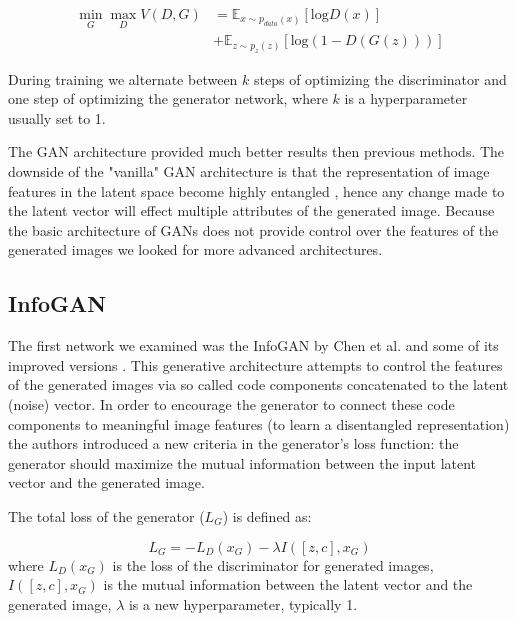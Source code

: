 \documentclass{egpubl}
\begin{document}
\begin{equation}
\begin{aligned}
\min_G \max_D V(D,G) &= \mathbb{E}_{x\sim p_{data}(x)}\left[ \mathrm{log}D(x) \right] \\
&+ \mathbb{E}_{z\sim p_{z}(z)}\left[ \mathrm{log}(1-D(G(z)))\right]
\end{aligned}
\end{equation}

During training we alternate between $k$ steps of optimizing the discriminator and one step of optimizing the generator network, where $k$ is a hyperparameter usually set to 1.

The GAN architecture provided much better results then previous methods. The downside of the "vanilla" GAN architecture is that the representation of image features in the latent space become highly entangled \cite{radford2015unsupervised}, hence any change made to the latent vector will effect multiple attributes of the generated image. Because the basic architecture of GANs does not provide control over the features of the generated images we looked for more advanced architectures.


\subsection{InfoGAN}

The first network we examined was the InfoGAN by Chen et al. \cite{chen2016infogan} and some of its improved versions \cite{10.1007/978-3-319-78452-6_5}\cite{mirza2014conditional}. This generative architecture attempts to control the features of the generated images via so called code components concatenated to the latent (noise) vector. In order to encourage the generator to connect these code components to meaningful image features (to learn a disentangled representation) the authors introduced a new criteria in the generator's loss function: the generator should maximize the mutual information between the input latent vector and the generated image.

The total loss of the generator ($L_G$) is defined as:

\begin{equation}\label{g_loss}
L_G = -L_D(x_G) - \lambda I([z,c], x_G)
\end{equation}
where $L_D(x_G)$ is the loss of the discriminator for generated images, $I([z,c], x_G)$ is the mutual information between the latent vector and the generated image, $\lambda$ is a new hyperparameter, typically 1.
\end{document}
